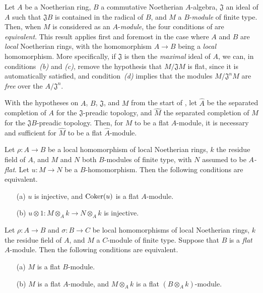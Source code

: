 \begin{env}[10.2.2]
\label{0.10.2.2}
Let $A$ be a Noetherian ring, $B$ a commutative Noetherian $A$-algebra, $\mathfrak{J}$ an ideal of $A$ such that $\mathfrak{J}B$ is contained in the radical of $B$, and $M$ a $B$-\emph{module} of finite type.
Then, when $M$ is considered as an $A$-\emph{module}, the four conditions of  are \emph{equivalent}.
This result applies first and foremost in the case where $A$ and $B$ are \emph{local} Noetherian rings, with the homomorphism $A\to B$ being a \emph{local} homomorphism.
More specifically, if $\mathfrak{J}$ is then the \emph{maximal} ideal of $A$, we can, in conditions~\emph{(b)} and \emph{(c)}, remove the hypothesis that $M/\mathfrak{J}M$ is flat, since it is automatically satisfied, and condition~\emph{(d)} implies that the modules $M/\mathfrak{J}^nM$ are \emph{free} over the $A/\mathfrak{J}^n$.
\end{env}

\begin{env}[10.2.3]
\label{0.10.2.3}
With the hypotheses on $A$, $B$, $\mathfrak{J}$, and $M$ from the start of , let $\widehat{A}$ be the separated completion of $A$ for the $\mathfrak{J}$-preadic topology, and $\widehat{M}$ the separated completion of $M$ for the $\mathfrak{J}B$-preadic topology.
Then, for $M$ to be a flat $A$-module, it is necessary and sufficient for $\widehat{M}$ to be a flat $\widehat{A}$-module.
\end{env}

\begin{env}[10.2.4]
\label{0.10.2.4}
Let $\rho:A\to B$ be a local homomorphism of local Noetherian rings, $k$ the residue field of $A$, and $M$ and $N$ both $B$-modules of finite type, with $N$ assumed to be \emph{$A$-flat}.
Let $u:M\to N$ be a $B$-homomorphism.
Then the following conditions are equivalent.
\begin{enumerate}
  \item[(a)] $u$ is injective, and $\operatorname{Coker}(u)$ is a flat $A$-module.
  \item[(b)] $u\otimes1:M\otimes_A k\to N\otimes_A k$ is injective.
\end{enumerate}
\end{env}

\begin{env}[10.2.5]
\label{0.10.2.5}
Let $\rho:A\to B$ and $\sigma:B\to C$ be local homomorphisms of local Noetherian rings, $k$ the residue field of $A$, and $M$ a $C$-module of finite type.
Suppose that $B$ is a \emph{flat} $A$-module.
Then the following conditions are equivalent.
\begin{enumerate}
  \item[(a)] $M$ is a flat $B$-module.
  \item[(b)] $M$ is a flat $A$-module, and $M\otimes_A k$ is a flat $(B\otimes_A k)$-module.
\end{enumerate}
\end{env}

